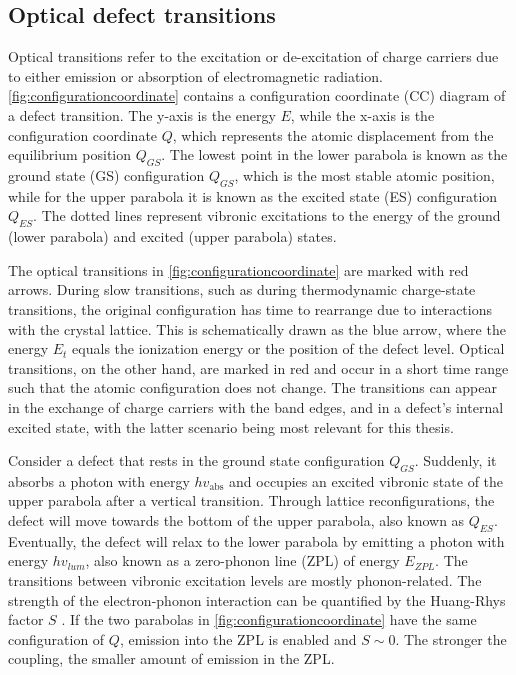 

\subsection{Optical defect transitions}

Optical transitions refer to the excitation or de-excitation of charge carriers due to either emission or absorption of electromagnetic radiation. %
\autoref{fig:configurationcoordinate} contains a configuration coordinate (CC) diagram of a defect transition. The y-axis is the energy $E$, while the x-axis is the configuration coordinate $Q$, which represents the atomic displacement from the equilibrium position $Q_{GS}$. The lowest point in the lower parabola is known as the ground state (GS) configuration $Q_{GS}$, which is the most stable atomic position, while for the upper parabola it is known as the excited state (ES) configuration $Q_{ES}$. The dotted lines represent vibronic excitations to the energy of the ground (lower parabola) and excited (upper parabola) states.

The optical transitions in \autoref{fig:configurationcoordinate} are marked with red arrows. During slow transitions, such as during thermodynamic charge-state transitions, the original configuration has time to rearrange due to interactions with the crystal lattice. This is schematically drawn as the blue arrow, where the energy $E_t$ equals the ionization energy or the position of the defect level. Optical transitions, on the other hand, are marked in red and occur in a short time range such that the atomic configuration does not change. The transitions can appear in the exchange of charge carriers with the band edges, and in a defect's internal excited state, with the latter scenario being most relevant for this thesis.

Consider a defect that rests in the ground state configuration $Q_{GS}$. Suddenly, it absorbs a photon with energy $h v_{\text{abs}}$ and occupies an excited vibronic state of the upper parabola after a vertical transition. Through lattice reconfigurations, the defect will move towards the bottom of the upper parabola, also known as $Q_{ES}$. Eventually, the defect will relax to the lower parabola by emitting a photon with energy $h v_{lum}$, also known as a zero-phonon line (ZPL) of energy $E_{ZPL}$. The transitions between vibronic excitation levels are mostly phonon-related.
The strength of the electron-phonon interaction can be quantified by the Huang-Rhys factor $S$ \cite{Huang1950}. If the two parabolas in \autoref{fig:configurationcoordinate} have the same configuration of $Q$, emission into the ZPL is enabled and $S\sim 0$. The stronger the coupling, the smaller amount of emission in the ZPL.

